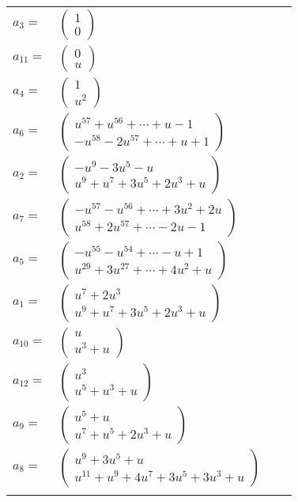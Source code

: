 \documentclass[1p]{elsarticle_modified}
\theoremstyle{definition}
\begin{document}
\begin{tabular}{m{7pt} m{180pt} m{7pt} m{180pt} }
\flushright $a_{3}=$&$\begin{pmatrix}1\\0\end{pmatrix}$ \\
\flushright $a_{11}=$&$\begin{pmatrix}0\\u\end{pmatrix}$ \\
\flushright $a_{4}=$&$\begin{pmatrix}1\\u^2\end{pmatrix}$ \\
\flushright $a_{6}=$&$\begin{pmatrix}u^{57}+u^{56}+\cdots+u-1\\- u^{58}-2 u^{57}+\cdots+u+1\end{pmatrix}$ \\
\flushright $a_{2}=$&$\begin{pmatrix}- u^9-3 u^5- u\\u^9+u^7+3 u^5+2 u^3+u\end{pmatrix}$ \\
\flushright $a_{7}=$&$\begin{pmatrix}- u^{57}- u^{56}+\cdots+3 u^2+2 u\\u^{58}+2 u^{57}+\cdots-2 u-1\end{pmatrix}$ \\
\flushright $a_{5}=$&$\begin{pmatrix}- u^{55}- u^{54}+\cdots- u+1\\u^{29}+3 u^{27}+\cdots+4 u^2+u\end{pmatrix}$ \\
\flushright $a_{1}=$&$\begin{pmatrix}u^7+2 u^3\\u^9+u^7+3 u^5+2 u^3+u\end{pmatrix}$ \\
\flushright $a_{10}=$&$\begin{pmatrix}u\\u^3+u\end{pmatrix}$ \\
\flushright $a_{12}=$&$\begin{pmatrix}u^3\\u^5+u^3+u\end{pmatrix}$ \\
\flushright $a_{9}=$&$\begin{pmatrix}u^5+u\\u^7+u^5+2 u^3+u\end{pmatrix}$ \\
\flushright $a_{8}=$&$\begin{pmatrix}u^9+3 u^5+u\\u^{11}+u^9+4 u^7+3 u^5+3 u^3+u\end{pmatrix}$\\&\end{tabular}
\end{document}
